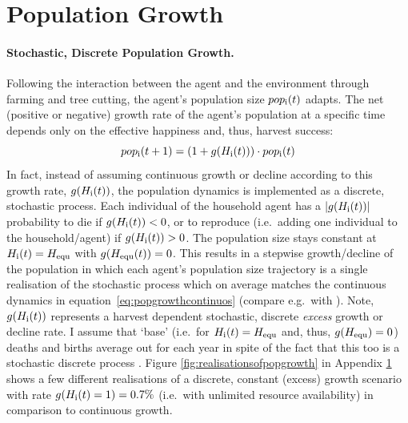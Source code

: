 
\FloatBarrier
\section{Population Growth}\label{sec:PopGrowth}
\paragraph{Stochastic, Discrete Population Growth.}
Following the interaction between the agent and the environment through farming and tree cutting, the agent's population size $pop_{\rm i}(t)$ adapts. 
The net (positive or negative) growth rate of the agent's population at a specific time depends only on the effective happiness and, thus, harvest success:
\begin{equation}\label{eq:popgrowthcontinuos}
pop_{\rm i}(t+1) = (1+g(H_{\rm i}(t))) \cdot pop_{\rm i}(t)
\end{equation}
In fact, instead of assuming continuous growth or decline according to this growth rate, $g(H_{\rm i}(t))$, the population dynamics is implemented as a discrete, stochastic process.
Each individual of the household agent has a $|g(H_{\rm i}(t))|$ probability to die if $g(H_{\rm i}(t))<0$, or %
to reproduce (i.e.\ adding one individual to the household/agent) if $g(H_{\rm i}(t))>0$.
The population size stays constant at $H_{\rm i}(t) = H_{\rm equ}$ with $g(H_{\rm equ}(t))=0$. 
This results in a stepwise growth/decline of the population in which each agent's population size trajectory is a single realisation of the stochastic process which on average matches the continuous dynamics in equation~\ref{eq:popgrowthcontinuos} (compare e.g.\ with ).
Note, $g(H_{\rm i}(t))$ represents a harvest dependent stochastic, discrete \textit{excess} growth or decline rate. 
I assume that `base' (i.e.\ for $H_{\rm i}(t) = H_{\rm equ}$ and, thus, $g(H_{\rm equ})=0$) deaths and births average out for each year in spite of the fact that this too is a stochastic discrete process \citep{Bungartz2009}.
Figure \ref{fig:realisationsofpopgrowth} in Appendix \ref{sec:PopGrowth} shows a few different realisations of a discrete, constant (excess) growth scenario with rate $g(H_{\rm i}(t)=1)=0.7\%$ (i.e.\ with unlimited resource availability) in comparison to continuous growth.

